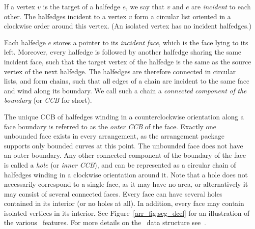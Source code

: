 If a vertex $v$ is the target of a halfedge $e$, we say that $v$
and $e$ are {\em incident} to each other. The halfedges incident
to a vertex $v$ form a circular list oriented in a clockwise order
around this vertex. (An isolated vertex has no incident halfedges.)

Each halfedge $e$ stores a pointer to its {\it incident face},
which is the face lying to its left. Moreover, every halfedge is
followed by another halfedge sharing the same incident face, such
that the target vertex of the halfedge is the same as the source
vertex of the next halfedge. The halfedges are therefore connected
in circular lists, and form chains, such that all edges of a chain
are incident to the same face and wind along its boundary. We call
such a chain a {\em connected component of the boundary} (or {\em
CCB} for short).

The unique CCB of halfedges winding in a counterclockwise orientation
along a face boundary is referred to as the {\em outer CCB} of the
face. Exactly one unbounded face exists in every arrangement, as the
arrangement package supports only bounded curves at this point. The
unbounded face does not have an outer boundary. Any other connected
component of the boundary of the face is called a {\em hole} (or {\em
inner CCB}), and can be represented as a circular chain of halfedges
winding in a clockwise orientation around it. Note that a hole does not
necessarily correspond to a single face, as it may have no area,
or alternatively it may consist of several connected faces.  Every
face can have several holes contained in its interior (or no holes at
all). In addition, every face may contain isolated vertices in its
interior. See Figure~\ref{arr_fig:seg_dcel} for an illustration of the
various \dcel\ features. For more details on the \dcel\ data structure
see~\cite[Chapter~2]{bkos-cgaa-00}.

